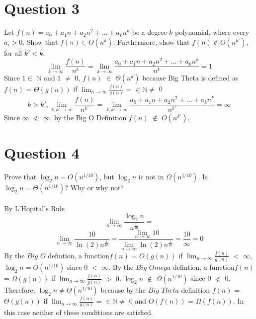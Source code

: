 \documentclass{article}
\begin{document}
\section*{Question 3}
 Let $f(n) = a_{0} + a_{1} n + a_{2} n^{2} +
  \ldots + a_{k} n^{k}$ be a degree-$k$ polynomial, where every $a_{i} >
  0$. Show that $f(n) \in \Theta(n^{k})$. 
  Furthermore, show that $f(n) \notin O(n^{k'})$, for all $k' < k$. \\
$$\lim_{k\to\infty} \frac{f(n)}{n^k} = \lim_{k\to\infty} \frac{a_{0} + a_{1} n + a_{2} n^{2} +
  \ldots + a_{k} n^{k}}{n^k} = 1$$ Since $1 \in $ $\mathbb{N}$ and $1$ $\neq$ 0, $f(n)$ $\in$ $\Theta{(n^k)}$ because Big Theta is defined as  \\$f(n)$ = $\Theta{(g(n))}$ if $\lim_{n\to\infty} \frac{f(n)}{g(n)}$ = $ \in \mathbb{N} \neq$ 0\\
$$ k > {k'}, \lim_{k, {k'}\to\infty} \frac{f(n)}{n^{k'}} = \lim_{k, {k'}\to\infty} \frac{a_{0} + a_{1} n + a_{2} n^{2} +
  \ldots + a_{k} n^{k}}{n^{k'}} = \infty$$ Since $\infty$ $\nless$ $\infty$, by the Big O Definition $f{(n)}$ $\notin$ $O{(n^{k'})}$.


\section*{Question 4}
 Prove that $\log_2n = O(n^{1/10})$, but $\log_2n$ is not in $\Omega(n^{1/10})$. Is $\log_2n = \Theta(n^{1/10})$?
Why or why not?\\\\
By L'Hopital's Rule$$ \lim_{n\to\infty} \frac{\log_2n}{n^{\frac{1}{10}}} = $$
$$\lim_{n\to\infty} \frac{10}{{\ln(2)}n^{\frac{1}{10}}} =  \frac{\lim_{n\to\infty}10}{{\lim_{n\to\infty}\ln(2)}n^{\frac{1}{10}}} = \frac{10}{\infty} = 0$$
By the $Big$ $O$ defintion, a function$f(n)$ = $O(g(n))$ if $\lim_{n\to\infty} \frac{f(n)}{g(n)}$ $<$ $\infty$, $\log_2n = O(n^{1/10})$ since 0 $<$ $\infty$.
 By the $Big$ $Omega$ defintion, a function$f(n)$ = $\Omega(g(n))$ if $\lim_{n\to\infty} \frac{f(n)}{g(n)}$ $>$ $0$, $\log_2n$ $\notin$ $\Omega(n^{1/10})$ since 0 
$\nless$ 0.  Therefore, $\log_2n \neq \Theta(n^{1/10})$ because by the $Big$ $Theta$ definition $f(n)$ = $\Theta{(g(n))}$ if $\lim_{n\to\infty} \frac{f(n)}{g(n)}$ = $ \in \mathbb{N} \neq$ 0 and $O(f(n))$ = $\Omega(f(n))$.
In  this case neither of these conditions are satisfied.
\end{document}
